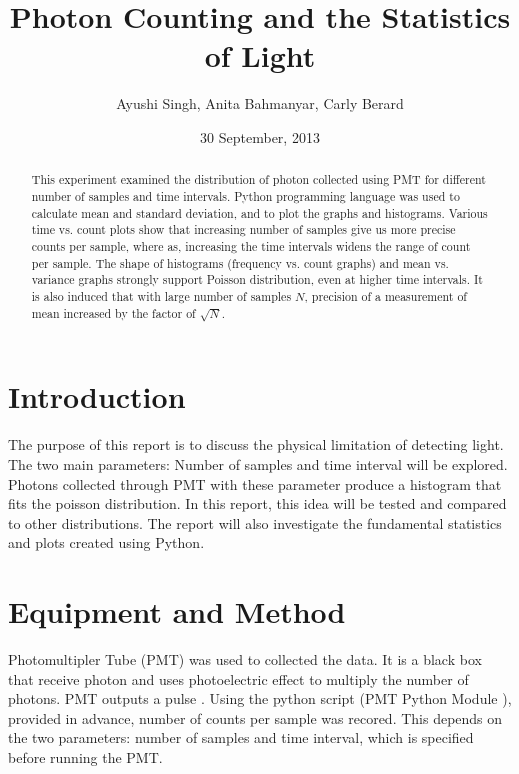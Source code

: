 \documentclass[a4paper,12pt]{article}
\makeatletter
\newcommand{\myemail}{ayushi.singh@mail.utoronto.ca}
\newcommand{\anita}{anita.bahmanyar@mail.utoronto.ca}
\newcommand{\carly}{c.berard@mail.utoronot.ca}
\makeatother
\begin{document}
\onehalfspacing
\title{Photon Counting and the Statistics of Light}
\author{Ayushi Singh, Anita Bahmanyar, Carly Berard}
\affil{\small {\myemail}}%
\date{30 September, 2013}
\maketitle

\begin{abstract}
\label{abstract}
This experiment examined the distribution of photon collected using PMT for different number of samples and time intervals. Python programming language was used to calculate mean and standard deviation, and to plot the graphs and histograms. Various time vs. count plots show that increasing number of samples give us more precise counts per sample, where as, increasing the time intervals widens the range of count per sample. The shape of histograms (frequency vs. count graphs) and mean vs. variance graphs strongly support Poisson distribution, even at higher time intervals. It is also induced that with large number of samples ${N}$, precision of a measurement of mean increased  by the factor of $\sqrt{N}$. 
\end{abstract}

\section{Introduction}
\label{sec:introduction}
The purpose of this report is to discuss the physical limitation of detecting light. The two main parameters: Number of samples and time interval will be explored. Photons collected through PMT with these parameter produce a histogram that fits the poisson distribution. In this report, this idea will be tested and compared to other distributions. The report will also investigate the fundamental statistics and plots created using Python.

\section{Equipment and Method}
\label{sec:equipment}
Photomultipler Tube (PMT) was used to collected the data. It is a black box that receive photon and uses photoelectric effect to multiply the number of photons. PMT outputs a pulse \citep{PMT}. Using the python script (PMT Python Module \citep{Module}), provided in advance, number of counts per sample was recored. This depends on the two parameters: number of samples and time interval, which is specified before running the PMT.
\end{document}

